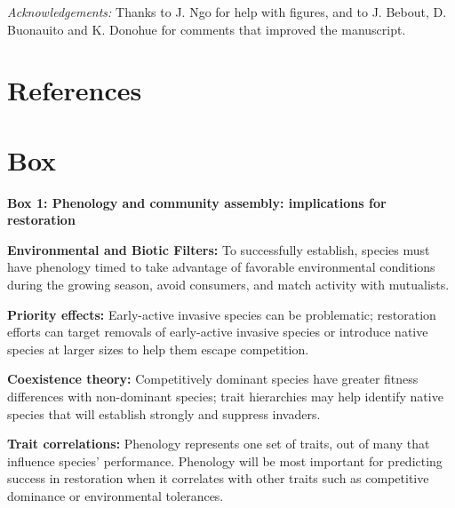 \documentclass[11pt]{article}
\begin{document}
\emph{Acknowledgements:} Thanks to J. Ngo for help with figures, and to J. Bebout, D. Buonauito and K. Donohue for comments that improved the manuscript.

\newpage
\section{References}


\newpage 
\section{Box}
{\bf Box 1: Phenology and community assembly: implications for restoration}

{\bf Environmental and Biotic Filters:} To successfully establish, species must have phenology timed to take advantage of favorable environmental conditions during the growing season, avoid consumers, and match activity with mutualists.

{\bf Priority effects:} Early-active invasive species can be problematic; restoration efforts can target removals of early-active invasive species or introduce native species at larger sizes to help them escape competition.

{\bf Coexistence theory:} Competitively dominant species have greater fitness differences with non-dominant species; trait hierarchies may help identify native species that will establish strongly and suppress invaders.

{\bf Trait correlations:} Phenology represents one set of traits, out of many that influence species’ performance. Phenology will be most important for predicting success in restoration when it correlates with other traits such as competitive dominance or environmental tolerances.
\end{document}
